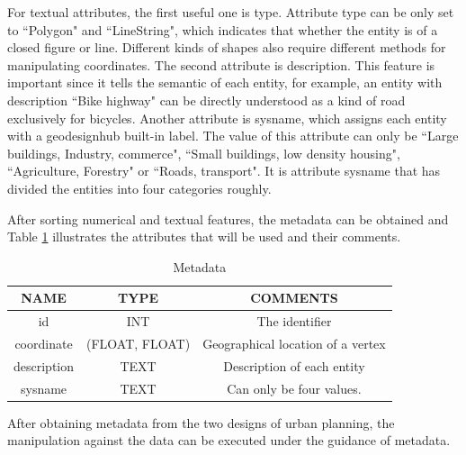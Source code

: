 For textual attributes, the first useful one is type. Attribute type can be only set to ``Polygon" and ``LineString", which indicates that whether the entity is of a closed figure or line. Different kinds of shapes also require different methods for manipulating coordinates. The second attribute is description. This feature is important since it tells the semantic of each entity, for example, an entity with description ``Bike highway" can be directly understood as a kind of road exclusively for bicycles. Another attribute is sysname, which assigns each entity with a geodesignhub built-in label. The value of this attribute can only be ``Large buildings, Industry, commerce", ``Small buildings, low density housing", ``Agriculture, Forestry" or ``Roads, transport". It is attribute sysname that has divided the entities into four categories roughly. 
\par
After sorting numerical and textual features, the metadata can be obtained and Table \ref{tab:metadata} illustrates the attributes that will be used and their comments.
\begin{table}[H]
\centering
\caption{Metadata}
\label{tab:metadata}
\begin{tabular}{|c|c|c|}
\hline
NAME & TYPE & COMMENTS \\ \hline
id & INT & The identifier \\ \hline
coordinate & (FLOAT, FLOAT) & Geographical location of a vertex \\ \hline
description & TEXT & Description of each entity \\ \hline
sysname & TEXT & Can only be four values. \\ \hline
\end{tabular}
\end{table}
After obtaining metadata from the two designs of urban planning, the manipulation against the data can be executed under the guidance of metadata.
